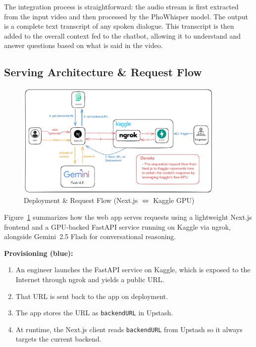 The integration process is straightforward: the audio stream is first extracted from the input video and then processed by the PhoWhisper model. The output is a complete text transcript of any spoken dialogue. This transcript is then added to the overall context fed to the chatbot, allowing it to understand and answer questions based on what is said in the video.


\subsection{Serving Architecture \& Request Flow}

\begin{figure}[H]
    \centering
    \includegraphics[width=0.9\textwidth]{image/high-level-architecture.png}
    \caption{Deployment \& Request Flow (Next.js $\Leftrightarrow$ Kaggle GPU)}
    \label{fig:deployment-flow}
\end{figure}

Figure~\ref{fig:deployment-flow} summarizes how the web app serves requests using a lightweight Next.js frontend and a GPU-backed FastAPI service running on Kaggle via ngrok, alongside Gemini~2.5 Flash for conversational reasoning.

\textbf{Provisioning (blue):}
\begin{enumerate}
    \item An engineer launches the FastAPI service on Kaggle, which is exposed to the Internet through ngrok and yields a public URL.
    \item That URL is sent back to the app on deployment.
    \item The app stores the URL as \texttt{backendURL} in Upstash.
    \item At runtime, the Next.js client reads \texttt{backendURL} from Upstash so it always targets the current backend.
\end{enumerate}

